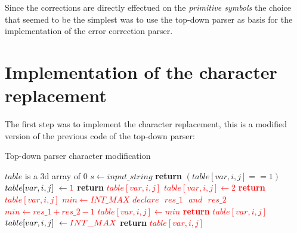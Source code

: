 Since the corrections are directly effectued on the \textit{primitive symbols} the choice that seemed to be the simplest was to use the top-down parser as basis for the implementation of the error correction parser.

\section{Implementation of the character replacement}

The first step was to implement the character replacement, this is a modified version of the previous code of the top-down parser:

\FloatBarrier
\begin{algorithm}
    \caption{Top-down parser character modification}
    \label{parse}
    \begin{algorithmic}[1]
        \State $table$ is a 3d array of 0
        \State $s \gets input\_string$
         
                \State \textbf{return} $(table[var, i, j] == 1)$
            \EndIf
                        \State $table[var, i, j] \gets \textcolor{red}{1}$
                        \State \textbf{return} \textcolor{red}{$table[var, i, j]$}
                    \EndIf
                \EndFor
                \textcolor{red}{
                    \State $table[var, i, j] \gets 2$
                    \State \textbf{return} $table[var, i, j]$
                \EndIf}
            \Else
                \State \textcolor{red}{$min \gets INT\_MAX$}
                        \State \textcolor{red}{$declare \text{ } res\_1 \text{ } and \text{ } res\_2$}
                        \textcolor{red}{
                                \State $min \gets res\_1 + res\_2 - 1$
                            \EndIf
                        \EndIf}
                    \EndFor
                \EndFor
                \State \textcolor{red}{$table[var, i, j] \gets min$}
                \State \textcolor{red}{\textbf{return} $table[var, i, j]$}
            \EndIf
            \State $table[var, i, j] \gets \textcolor{red}{INT\_MAX}$
            \State \textbf{return} \textcolor{red}{$table[var, i, j]$}
        \EndProcedure
    \end{algorithmic}
\end{algorithm}
\FloatBarrier


